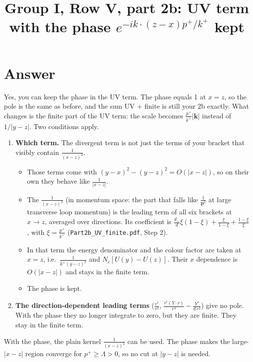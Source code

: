 \documentclass[10pt]{article}
\title{Group I, Row V, part 2b: UV term with the phase $e^{-ik\cdot(z-x)p^+/k^+}$ kept}
\date{}
\numberwithin{equation}{section}
\begin{document}
\maketitle

\section{Answer}
Yes, you can keep the phase in the UV term. The phase equals 1 at $x=z$, so the pole is the same as before, and the sum UV $+$ finite is still your 2b exactly. What changes is the finite part of the UV term: the scale becomes $\frac{p^+}{k^+}|\mathbf k|$ instead of $1/|y-z|$. Two conditions apply.
\begin{enumerate}
\item \textbf{Which term.} The divergent term is not just the terms of your bracket that visibly contain $\frac{1}{(x-z)^2}$.
\begin{itemize}
\item Those terms come with $(y-x)^2-(y-z)^2=O(|x-z|)$, so on their own they behave like $\frac{1}{|x-z|}$.
\item The $\frac{1}{(x-z)^2}$ (in momentum space: the part that falls like $\frac{1}{\mathbf p^2}$ at large transverse loop momentum) is the leading term of all six brackets at $x\to z$, averaged over directions. Its coefficient is $\frac{d_\perp}{d}\xi(1-\xi)+\frac{\xi}{1-\xi}+\frac{1-\xi}{\xi}$, with $\xi=\frac{p^+}{k^+}$ (\texttt{Part2b\_UV\_finite.pdf}, Step 2).
\item In that term the energy denominator and the colour factor are taken at $x=z$, i.e.\ $\frac{1}{k^+(y-z)^2}$ and $N_c[U(y)-U(z)]$. Their $x$ dependence is $O(|x-z|)$ and stays in the finite term.
\item The phase is kept.
\end{itemize}
\item \textbf{The direction-dependent leading terms} ($\frac{r^i}{r^2}$, $\frac{r^i(Y\cdot r)}{r^4}-\frac{Y^i}{d\,r^2}$) give no pole. With the phase they no longer integrate to zero, but they are finite. They stay in the finite term.
\end{enumerate}
With the phase, the plain kernel $\frac{1}{(x-z)^2}$ can be used. The phase makes the large-$|x-z|$ region converge for $p^+\ge\Lambda>0$, so no cut at $|y-z|$ is needed.

\end{document}
